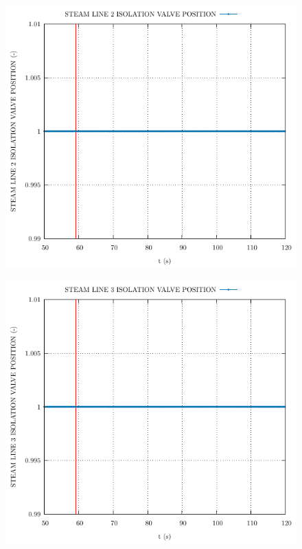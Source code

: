 \documentclass{article}
\begin{document}
\begin{multicols}{2}
\begin{figure}[H]
\end{figure}
\begin{figure}[H]
\centering
\includegraphics[width=\linewidth]{./graphs/STEAM LINE 2 ISOLATION VALVE POSITION_comp.pdf}
\end{figure}
\begin{figure}[H]
\centering
\includegraphics[width=\linewidth]{./graphs/STEAM LINE 3 ISOLATION VALVE POSITION_comp.pdf}

\end{figure}
\end{multicols}
\end{document}
